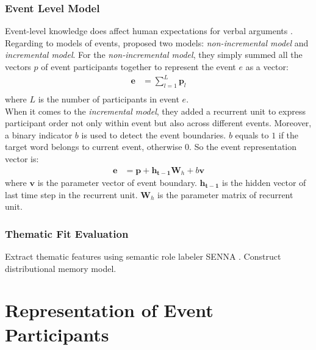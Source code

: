 \documentclass[a4paper]{article}
\begin{document}
\subsubsection{Event Level Model}
Event-level knowledge does affect human expectations for verbal arguments \citep{baroni2010distributional}. \\
\noindent 
Regarding to models of events, \citet{tilk2016event} proposed two models: \textit{non-incremental model} and \textit{incremental model}. For the \textit{non-incremental model}, they simply summed all the vectors $p$ of event participants together to represent the event $e$ as a vector:
\begin{equation} \label{eq:20}
\begin{aligned}
    \mathbf{e}
        &= \sum_{l=1}^{L} \mathbf{p}_{l} \\
\end{aligned}
\end{equation}
where $L$ is the number of participants in event $e$. \\
\noindent
When it comes to the \textit{incremental model}, they added a recurrent unit to express participant order not only within event but also across different events. Moreover, a binary indicator $b$ is used to detect the event boundaries. $b$ equals to $1$ if the target word belongs to current event, otherwise $0$. So the event representation vector is: 
\begin{equation} \label{eq:21}
\begin{aligned}
    \mathbf{e}
        &= \mathbf{p} + \mathbf{h_{t-1}}\mathbf{W}_h + b\mathbf{v}
\end{aligned}
\end{equation} 
where $\mathbf{v}$ is the parameter vector of event boundary. $\mathbf{h_{t-1}}$ is the hidden vector of last time step in the recurrent unit. $\mathbf{W}_h$ is the parameter matrix of recurrent unit. 

\subsubsection{Thematic Fit Evaluation}
\citet{sayeed2014combining} 
Extract thematic features using semantic role labeler SENNA \citep{collobert2011natural}.
Construct distributional memory model. 



\section{Representation of Event Participants}
\end{document}
